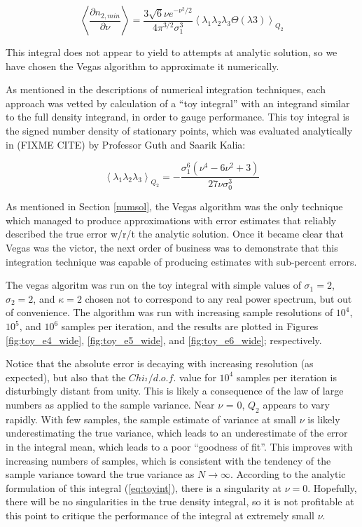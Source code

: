 \documentclass[10pt,letterpaper]{article}
\def\expect#1{\left\langle #1 \right\rangle} %
\begin{document}
$$\left\langle \frac{\partial n_{2,min}}{\partial \nu} \right\rangle = \displaystyle{\frac{3 \sqrt{6} \nu e^{-\nu^2/2}}{4 \pi^{3/2} \sigma_1^3}} \expect{\lambda_1 \lambda_2 \lambda_3 \Theta(\lambda 3)}_{Q_2}$$

This integral does not appear to yield to attempts at analytic solution, so we have chosen the Vegas algorithm to approximate it numerically.

As mentioned in the descriptions of numerical integration techniques, each approach was vetted by calculation of a ``toy integral'' with an integrand similar to the full density integrand, in order to gauge performance. This toy integral is the signed number density of stationary points, which was evaluated analytically in (FIXME CITE) by Professor Guth and Saarik Kalia:

\begin{equation} \label{eq:toyint}
\expect{\lambda_1 \lambda_2 \lambda_3}_{Q_2} = \displaystyle{- \frac{\sigma_1^6 (\nu^4 - 6\nu^2 +3)}{27 \nu \sigma_0^3}}
\end{equation}

As mentioned in Section \ref{numsol}, the Vegas algorithm was the only technique which managed to produce approximations with error estimates that reliably described the true error w/r/t the analytic solution. Once it became clear that Vegas was the victor, the next order of business was to demonstrate that this integration technique was capable of producing estimates with sub-percent errors. 

The vegas algoritm was run on the toy integral with simple values of $\sigma_1=2$, $\sigma_2=2$, and $\kappa=2$ chosen not to correspond to any real power spectrum, but out of convenience. The algorithm was run with increasing sample resolutions of $10^4$, $10^5$, and $10^6$ samples per iteration, and the results are plotted in Figures \ref{fig:toy_e4_wide}, \ref{fig:toy_e5_wide}, and \ref{fig:toy_e6_wide}; respectively.

Notice that the absolute error is decaying with increasing resolution (as expected), but also that the $Chi_^2/d.o.f.$ value for $10^4$ samples per iteration is disturbingly distant from unity. This is likely a consequence of the law of large numbers as applied to the sample variance. Near $\nu$ = 0, $Q_2$ appears to vary rapidly. With few samples, the sample estimate of variance at small $\nu$ is likely underestimating the true variance, which leads to an underestimate of the error in the integral mean, which leads to a poor ``goodness of fit''. This improves with increasing numbers of samples, which is consistent with the tendency of the sample variance toward the true variance as $N \rightarrow \infty$. According to the analytic formulation of this integral (\ref{eq:toyint}), there is a singularity at $\nu=0$. Hopefully, there will be no singularities in the true density integral, so it is not profitable at this point to critique the performance of the integral at extremely small $\nu$.
\end{document}
